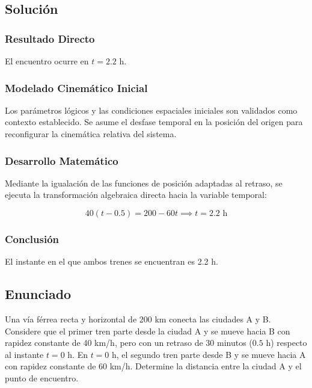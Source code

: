 \documentclass[12pt, a4paper]{article}
\begin{document}
\subsection*{Solución}

\subsubsection*{Resultado Directo}

El encuentro ocurre en $t = 2.2 \text{ h}$.

\subsubsection*{Modelado Cinemático Inicial}

Los parámetros lógicos y las condiciones espaciales iniciales son validados como contexto establecido. Se asume el desfase temporal en la posición del origen para reconfigurar la cinemática relativa del sistema.

\subsubsection*{Desarrollo Matemático}

Mediante la igualación de las funciones de posición adaptadas al retraso, se ejecuta la transformación algebraica directa hacia la variable temporal:

\begin{equation}
40(t - 0.5) = 200 - 60t \implies t = 2.2 \text{ h}
\end{equation}

\subsubsection*{Conclusión}

El instante en el que ambos trenes se encuentran es 2.2 h.

\newpage

\subsection*{Enunciado}

Una vía férrea recta y horizontal de 200 km conecta las ciudades A y B. Considere que el primer tren parte desde la ciudad A y se mueve hacia B con rapidez constante de 40 km/h, pero con un retraso de 30 minutos ($0.5 \text{ h}$) respecto al instante $t = 0 \text{ h}$. En $t = 0 \text{ h}$, el segundo tren parte desde B y se mueve hacia A con rapidez constante de 60 km/h. Determine la distancia entre la ciudad A y el punto de encuentro.
\end{document}
